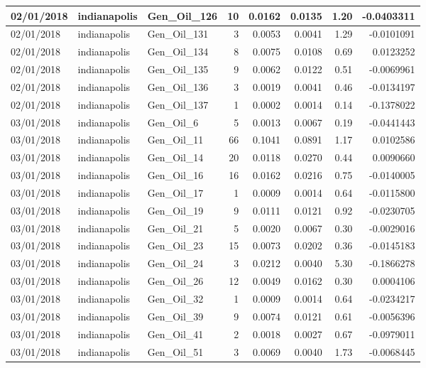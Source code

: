 \documentclass[
  letterpaper,
  DIV=11,
  numbers=noendperiod]{scrartcl}
\begin{document}
\begin{tabular}{l|l|l|r|r|r|r|r}
\hline
02/01/2018 & indianapolis & Gen\_Oil\_126 & 10 & 0.0162 & 0.0135 & 1.20 & -0.0403311\\
\hline
02/01/2018 & indianapolis & Gen\_Oil\_131 & 3 & 0.0053 & 0.0041 & 1.29 & -0.0101091\\
\hline
02/01/2018 & indianapolis & Gen\_Oil\_134 & 8 & 0.0075 & 0.0108 & 0.69 & 0.0123252\\
\hline
02/01/2018 & indianapolis & Gen\_Oil\_135 & 9 & 0.0062 & 0.0122 & 0.51 & -0.0069961\\
\hline
02/01/2018 & indianapolis & Gen\_Oil\_136 & 3 & 0.0019 & 0.0041 & 0.46 & -0.0134197\\
\hline
02/01/2018 & indianapolis & Gen\_Oil\_137 & 1 & 0.0002 & 0.0014 & 0.14 & -0.1378022\\
\hline
03/01/2018 & indianapolis & Gen\_Oil\_6 & 5 & 0.0013 & 0.0067 & 0.19 & -0.0441443\\
\hline
03/01/2018 & indianapolis & Gen\_Oil\_11 & 66 & 0.1041 & 0.0891 & 1.17 & 0.0102586\\
\hline
03/01/2018 & indianapolis & Gen\_Oil\_14 & 20 & 0.0118 & 0.0270 & 0.44 & 0.0090660\\
\hline
03/01/2018 & indianapolis & Gen\_Oil\_16 & 16 & 0.0162 & 0.0216 & 0.75 & -0.0140005\\
\hline
03/01/2018 & indianapolis & Gen\_Oil\_17 & 1 & 0.0009 & 0.0014 & 0.64 & -0.0115800\\
\hline
03/01/2018 & indianapolis & Gen\_Oil\_19 & 9 & 0.0111 & 0.0121 & 0.92 & -0.0230705\\
\hline
03/01/2018 & indianapolis & Gen\_Oil\_21 & 5 & 0.0020 & 0.0067 & 0.30 & -0.0029016\\
\hline
03/01/2018 & indianapolis & Gen\_Oil\_23 & 15 & 0.0073 & 0.0202 & 0.36 & -0.0145183\\
\hline
03/01/2018 & indianapolis & Gen\_Oil\_24 & 3 & 0.0212 & 0.0040 & 5.30 & -0.1866278\\
\hline
03/01/2018 & indianapolis & Gen\_Oil\_26 & 12 & 0.0049 & 0.0162 & 0.30 & 0.0004106\\
\hline
03/01/2018 & indianapolis & Gen\_Oil\_32 & 1 & 0.0009 & 0.0014 & 0.64 & -0.0234217\\
\hline
03/01/2018 & indianapolis & Gen\_Oil\_39 & 9 & 0.0074 & 0.0121 & 0.61 & -0.0056396\\
\hline
03/01/2018 & indianapolis & Gen\_Oil\_41 & 2 & 0.0018 & 0.0027 & 0.67 & -0.0979011\\
\hline
03/01/2018 & indianapolis & Gen\_Oil\_51 & 3 & 0.0069 & 0.0040 & 1.73 & -0.0068445\\

\end{tabular}
\end{document}
